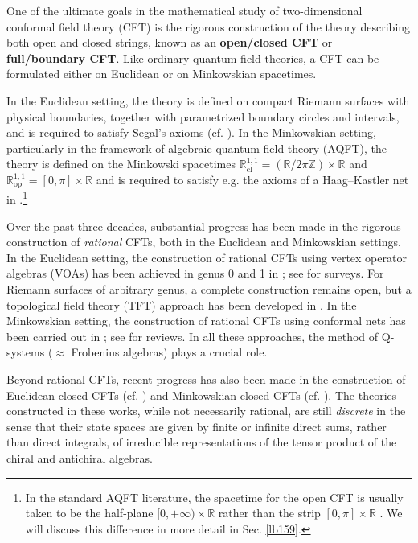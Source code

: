 \documentclass[11pt,b5paper,notitlepage]{article}
\theoremstyle{definition}
\theoremstyle{plain}
\newcommand{\Zbb}{\mathbb Z}
\newcommand{\Rbb}{\mathbb R}
\newcommand{\Rcl}{\mathbb R^{1,1}_{\mathrm{cl}}}
\newcommand{\Rop}{\mathbb R^{1,1}_{\mathrm{op}}}
\numberwithin{equation}{section}
\begin{document}
One of the ultimate goals in the mathematical study of two-dimensional conformal field theory (CFT) is the rigorous construction of the theory describing both open and closed strings, known as an \textbf{open/closed CFT} or \textbf{full/boundary CFT}. Like ordinary quantum field theories, a CFT can be formulated either on Euclidean or on Minkowskian spacetimes.  

In the Euclidean setting, the theory is defined on compact Riemann surfaces with physical boundaries, together with parametrized boundary circles and intervals, and is required to satisfy Segal's axioms (cf. \cite{Seg88,Seg04}). In the Minkowskian setting, particularly in the framework of algebraic quantum field theory (AQFT), the theory is defined on the Minkowski spacetimes $\Rcl=(\Rbb/2\pi\Zbb)\times\Rbb$ and $\Rop=[0,\pi]\times\Rbb$ and is required to satisfy e.g. the axioms of a Haag--Kastler net in \cite{Haag96}.\footnote{In the standard AQFT literature, the spacetime for the open CFT is usually taken to be the half-plane $[0,+\infty)\times\Rbb$ rather than the strip $[0,\pi]\times\Rbb$ . We will discuss this difference in more detail in Sec. \ref{lb159}.}



Over the past three decades, substantial progress has been made in the rigorous construction of \textit{rational} CFTs, both in the Euclidean and Minkowskian settings. In the Euclidean setting, the construction of rational CFTs using vertex operator algebras (VOAs) has been achieved in genus 0 and 1 in \cite{HK07,Kong07,Kong08a,Kong08b}; see \cite{KR10,Kong11} for surveys. For Riemann surfaces of arbitrary genus, a complete construction remains open, but a topological field theory (TFT) approach has been developed in \cite{FFFS02,FRS02,FRS05,FFRS06}. In the Minkowskian setting, the construction of rational CFTs using conformal nets has been carried out in \cite{LR95,KL04,LR04,LR09,CKL13,BKL15}; see \cite{KR10,Kaw15} for reviews. In all these approaches, the method of Q-systems ($\approx$ Frobenius algebras) plays a crucial role.



Beyond rational CFTs, recent progress has also been made in the construction of Euclidean closed CFTs (cf. \cite{Mor20,Mor23}) and Minkowskian closed CFTs (cf. \cite{AGT23,AGT25}). The theories constructed in these works, while not necessarily rational, are still \textit{discrete} in the sense that their state spaces are given by finite or infinite direct sums, rather than direct integrals, of irreducible representations of the tensor product of the chiral and antichiral algebras.
\end{document}
